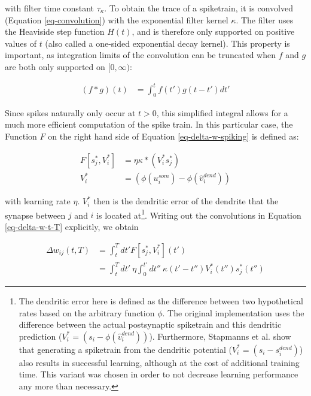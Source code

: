 with filter time constant $\tau_\kappa$. To obtain the trace of a spiketrain, it is convolved (Equation
\ref{eq-convolution}) with the exponential filter kernel $\kappa$. The filter uses the Heaviside step function $H(t)$,
and is therefore only supported on positive values of $t$ (also called a one-sided exponential decay kernel). This
property is important, as integration limits of the convolution can be truncated when $f$ and $g$ are both only
supported on $[0,\infty)$:

\begin{align}
  (f \ast g)(t) & = \int_{0}^{t} f(t') g(t-t') d t'
\end{align}

Since spikes naturally only occur at $t>0$, this simplified integral allows for a much more efficient computation of the
spike train. In this particular case, the Function $F$ on the right hand side of Equation \ref{eq-delta-w-spiking} is
defined as:

\begin{align}
  F[s_j^\ast, V_i^\ast] & = \eta \kappa \ast (V_i^\ast s_j^\ast)        \\
  V_i^\ast              & = (\phi(u_i^{som}) - \phi(\hat{v}_i^{dend}) )
\end{align}

 with learning rate $\eta$.
$V_i^\ast$ then is the dendritic error of the dendrite that the synapse between $j$ and $i$ is located at\footnote{The
dendritic error here is defined as the difference between two hypothetical rates based on the arbitrary function $\phi$.
The original implementation uses the difference between the actual postsynaptic spiketrain and this dendritic prediction
($V_i^\ast = (s_i - \phi(\hat{v}_i^{dend}) )$). Furthermore, Stapmanns et al. show that generating a spiketrain from the
dendritic potential ($V_i^\ast = (s_i - s_i^{dend})$) also results in successful learning, although at the cost of
additional training time. This variant was chosen in order to not decrease learning performance any more than
necessary.}. Writing out the convolutions in Equation \ref{eq-delta-w-t-T} explicitly, we obtain

\begin{align}
  \Delta w_{ij}(t,T) & = \int_t^T dt' F[s_j^\ast, V_i^\ast](t')                                                                           \\
                     & =  \int_t^T dt' \  \eta\int_0^{t'} dt'' \ \kappa(t'-t'') V_i^\ast (t'') s_j^\ast (t'') \label{eq-delta-w-t-T-long}
\end{align}

